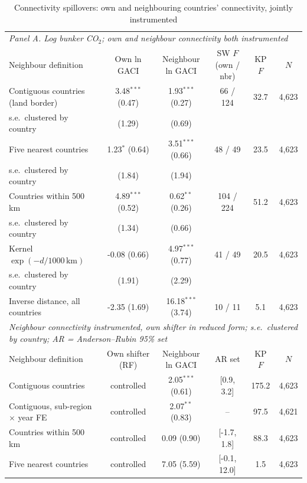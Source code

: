 \documentclass[12pt]{article}
\begin{document}
\begin{table}[htbp]
\centering
\begin{threeparttable}
\caption{Connectivity spillovers: own and neighbouring countries' connectivity, jointly instrumented}
\label{tab:spillover}
\footnotesize
\begin{tabular}{lccccc}
\toprule
\multicolumn{6}{l}{\textit{Panel A. Log bunker CO$_2$; own and neighbour connectivity both instrumented}} \\
Neighbour definition & Own ln GACI & Neighbour ln GACI & SW $F$ (own / nbr) & KP $F$ & $N$ \\
\midrule
  Contiguous countries (land border) & 3.48$^{***}$ (0.47) & 1.93$^{***}$ (0.27) & 66 / 124 & 32.7 & 4,623 \\
  \quad s.e.\ clustered by country & (1.29) & (0.69) & & & \\
  Five nearest countries & 1.23$^{*}$ (0.64) & 3.51$^{***}$ (0.66) & 48 / 49 & 23.5 & 4,623 \\
  \quad s.e.\ clustered by country & (1.84) & (1.94) & & & \\
  Countries within 500 km & 4.89$^{***}$ (0.52) & 0.62$^{**}$ (0.26) & 104 / 224 & 51.2 & 4,623 \\
  \quad s.e.\ clustered by country & (1.34) & (0.66) & & & \\
  Kernel $\exp(-d/1000\,\mathrm{km})$ & -0.08 (0.66) & 4.97$^{***}$ (0.77) & 41 / 49 & 20.5 & 4,623 \\
  \quad s.e.\ clustered by country & (1.91) & (2.29) & & & \\
  Inverse distance, all countries & -2.35 (1.69) & 16.18$^{***}$ (3.74) & 10 / 11 & 5.1 & 4,623 \\
\midrule
\multicolumn{6}{l}{\textit{Neighbour connectivity instrumented, own shifter in reduced form; s.e.\ clustered by country; AR = Anderson--Rubin 95\% set}} \\
Neighbour definition & Own shifter (RF) & Neighbour ln GACI & AR set & KP $F$ & $N$ \\
  Contiguous countries & controlled & 2.05$^{***}$ (0.61) & [0.9, 3.2] & 175.2 & 4,623 \\
  Contiguous, sub-region $\times$ year FE & controlled & 2.07$^{**}$ (0.83) & -- & 97.5 & 4,621 \\
  Countries within 500 km & controlled & 0.09 (0.90) & [-1.7, 1.8] & 88.3 & 4,623 \\
  Five nearest countries & controlled & 7.05 (5.59) & [-0.1, 12.0] & 1.5 & 4,623 \\

\end{tabular}
\end{threeparttable}
\end{table}
\end{document}
